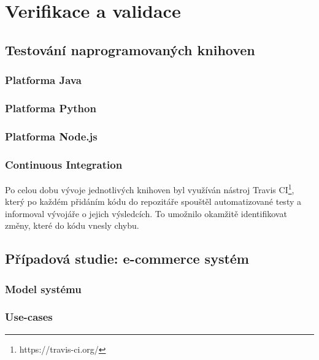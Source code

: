 \usepackage[T1]{fontenc}
\usepackage[utf8]{inputenc}


\chapter{Verifikace a validace}\label{ch:verifikace}

\section{Testování naprogramovaných knihoven}

\subsection{Platforma Java}

\subsection{Platforma Python}

\subsection{Platforma Node.js}

\subsection{Continuous Integration}

Po celou dobu vývoje jednotlivých knihoven byl využíván nástroj
Travis CI\footnote{
https://travis-ci.org/
}, který po každém přidáním kódu do repozitáře spouštěl automatizované
testy a informoval vývojáře o jejich výsledcích. To umožnilo okamžitě
identifikovat změny, které do kódu vnesly chybu.

\section{Případová studie: e-commerce systém}

\subsection{Model systému}

\subsection{Use-cases}

